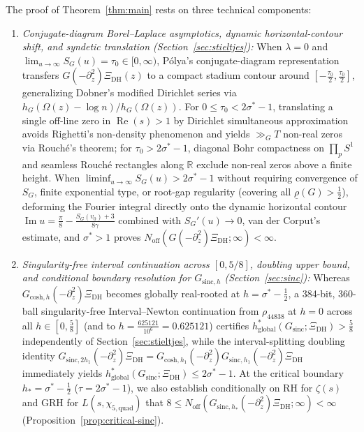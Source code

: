 \documentclass[11pt,a4paper,reqno]{amsart}
\theoremstyle{definition}
\theoremstyle{remark}
\numberwithin{equation}{section}
\newcommand{\R}{\mathbb{R}}
\DeclareMathOperator{\Reop}{Re}
\DeclareMathOperator{\Imop}{Im}
\begin{document}
The proof of Theorem~\ref{thm:main} rests on three technical components:
\begin{enumerate}[label=\textup{(\arabic*)},leftmargin=2.2em]
  \item \emph{Conjugate-diagram Borel--Laplace asymptotics, dynamic horizontal-contour shift, and syndetic translation (Section~\ref{sec:stieltjes}):} When $\lambda = 0$ and $\lim_{u\to\infty} S_G(u) = \tau_0 \in [0,\infty)$, P\'olya's conjugate-diagram representation transfers $G(-\partial_z^2)\Xi_{\mathrm{DH}}(z)$ to a compact stadium contour around $[-\frac{\tau_0}{2}, \frac{\tau_0}{2}]$, generalizing Dobner's modified Dirichlet series \cite{dobner2021} via $h_G(\Omega(z)-\log n)/h_G(\Omega(z))$. For $0 \le \tau_0 < 2\sigma^* - 1$, translating a single off-line zero in $\Reop(s) > 1$ by Dirichlet simultaneous approximation avoids Righetti's non-density phenomenon \cite{righetti2017} and yields $\gg_G T$ non-real zeros via Rouch\'e's theorem; for $\tau_0 > 2\sigma^* - 1$, diagonal Bohr compactness on $\prod_p S^1$ and seamless Rouch\'e rectangles along $\R$ exclude non-real zeros above a finite height. When $\liminf_{u\to\infty} S_G(u) > 2\sigma^* - 1$ without requiring convergence of $S_G$, finite exponential type, or root-gap regularity (covering all $\underline{\rho}(G) > \frac{1}{2}$), deforming the Fourier integral directly onto the dynamic horizontal contour $\Imop u = \frac{\pi}{8} - \frac{S_G(v_0) + 3}{8\gamma}$ combined with $S_G'(u) \to 0$, van der Corput's estimate, and $\sigma^* > 1$ proves $N_{\mathrm{off}}(G(-\partial_z^2)\Xi_{\mathrm{DH}}; \infty) < \infty$.
  \item \emph{Singularity-free interval continuation across $[0, 5/8]$, doubling upper bound, and conditional boundary resolution for $G_{\mathrm{sinc},h}$ (Section~\ref{sec:sinc}):} Whereas $G_{\mathrm{cosh},h}(-\partial_z^2)\Xi_{\mathrm{DH}}$ becomes globally real-rooted at $h = \sigma^* - \frac{1}{2}$, a 384-bit, 360-ball singularity-free Interval--Newton continuation from $\rho_{44838}$ at $h = 0$ across all $h \in [0, \frac{5}{8}]$ (and to $h = \frac{625121}{10^6} = 0.625121$) certifies $h_{\mathrm{global}}^*(G_{\mathrm{sinc}}; \Xi_{\mathrm{DH}}) > \frac{5}{8}$ independently of Section~\ref{sec:stieltjes}, while the interval-splitting doubling identity $G_{\mathrm{sinc},2h_1}(-\partial_z^2)\Xi_{\mathrm{DH}} = G_{\mathrm{cosh},h_1}(-\partial_z^2)G_{\mathrm{sinc},h_1}(-\partial_z^2)\Xi_{\mathrm{DH}}$ immediately yields $h_{\mathrm{global}}^*(G_{\mathrm{sinc}}; \Xi_{\mathrm{DH}}) \le 2\sigma^* - 1$. At the critical boundary $h_* = \sigma^* - \frac{1}{2}$ ($\tau = 2\sigma^* - 1$), we also establish conditionally on RH for $\zeta(s)$ and GRH for $L(s, \chi_{5,\mathrm{quad}})$ that $8 \le N_{\mathrm{off}}(G_{\mathrm{sinc},h_*}(-\partial_z^2)\Xi_{\mathrm{DH}}; \infty) < \infty$ (Proposition~\ref{prop:critical-sinc}).

\end{enumerate}
\end{document}
